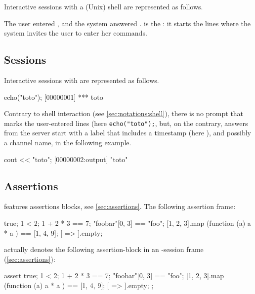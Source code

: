 Interactive sessions with a (Unix) shell are represented as follows.


The user entered , and the system answered
.  \samp{\$} is the : it starts the lines where
the system invites the user to enter her commands.

\subsection{\us Sessions}
\label{sec:notations:us}

Interactive sessions with \urbi are represented as follows.

\begin{urbiscript}[firstnumber=1]
echo("toto");
[00000001] *** toto
\end{urbiscript}

Contrary to shell interaction (see \autoref{sec:notations:shell}),
there is no prompt that marks the user-entered lines (here
\lstinline|echo("toto");|, but, on the contrary, answers from the \urbi
server start with a label that includes a timestamp (here
), and possibly a channel name,  in the
following example.

\begin{urbiscript}
cout << "toto";
[00000002:output] "toto"
\end{urbiscript}


\subsection{\us Assertions}
\label{sec:notations:urbiassert}

\us features assertions blocks, see \autoref{sec:assertions}.  The
following assertion frame:

\begin{urbiassert}
true;
1 < 2;
1 + 2 * 3 == 7;
"foobar"[0, 3] == "foo";
[1, 2, 3].map (function (a) { a * a }) == [1, 4, 9];
[ => ].empty;
\end{urbiassert}

\noindent
actually denotes the following assertion-block in an \us-session
frame (\autoref{sec:assertions}):

\begin{urbiscript}
assert
{
  true;
  1 < 2;
  1 + 2 * 3 == 7;
  "foobar"[0, 3] == "foo";
  [1, 2, 3].map (function (a) { a * a }) == [1, 4, 9];
  [ => ].empty;
};
\end{urbiscript}

